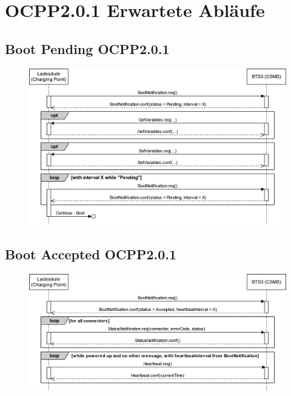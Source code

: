 \appendix
\section{OCPP2.0.1 Erwartete Abläufe}
\label{Ablauefe_OCPP201}
\subsection{Boot Pending OCPP2.0.1}
\begin{figure} [H]
    \centering
    \includegraphics[width=1.0\textwidth]{images/OCPP/Boot_Pending_OCPP201.drawio(1).png}
\end{figure}
\newpage
\subsection{Boot Accepted OCPP2.0.1}
\begin{figure} [H]
	\centering
	\includegraphics[width=1.0\textwidth]{images/OCPP/OCPP_201_Boot_Accepted.drawio.png}
\end{figure}

\newpage
